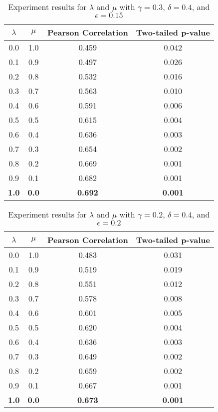 \documentclass{article}
\begin{document}
\begin{table}[h!]
\centering
\begin{tabular}{|c|c||c|c|}
	\hline
	$\lambda$ & $\mu$ & Pearson Correlation & Two-tailed p-value \\
	\hline
	0.0 & 1.0 & 0.459 & 0.042 \\
	0.1 & 0.9 & 0.497 & 0.026 \\
	0.2 & 0.8 & 0.532 & 0.016 \\
	0.3 & 0.7 & 0.563 & 0.010 \\
	0.4 & 0.6 & 0.591 & 0.006 \\
	0.5 & 0.5 & 0.615 & 0.004 \\
	0.6 & 0.4 & 0.636 & 0.003 \\
	0.7 & 0.3 & 0.654 & 0.002 \\
	0.8 & 0.2 & 0.669 & 0.001 \\
	0.9 & 0.1 & 0.682 & 0.001 \\
	\textbf{1.0} & \textbf{0.0} & \textbf{0.692} & \textbf{0.001} \\
	\hline
\end{tabular}
\caption{Experiment results for $\lambda$ and $\mu$ with $\gamma = 0.3$, $\delta = 0.4$, and $\epsilon = 0.15$}
\label{table:lambdamuresults1}
\end{table}

\begin{table}[h!]
\centering
\begin{tabular}{|c|c||c|c|}
	\hline
	$\lambda$ & $\mu$ & Pearson Correlation & Two-tailed p-value \\
	\hline
	0.0 & 1.0 & 0.483 & 0.031 \\
	0.1 & 0.9 & 0.519 & 0.019 \\
	0.2 & 0.8 & 0.551 & 0.012 \\
	0.3 & 0.7 & 0.578 & 0.008 \\
	0.4 & 0.6 & 0.601 & 0.005 \\
	0.5 & 0.5 & 0.620 & 0.004 \\
	0.6 & 0.4 & 0.636 & 0.003 \\
	0.7 & 0.3 & 0.649 & 0.002 \\
	0.8 & 0.2 & 0.659 & 0.002 \\
	0.9 & 0.1 & 0.667 & 0.001 \\
	\textbf{1.0} & \textbf{0.0} & \textbf{0.673} & \textbf{0.001} \\	
	\hline
\end{tabular}
\caption{Experiment results for $\lambda$ and $\mu$ with $\gamma = 0.2$, $\delta = 0.4$, and $\epsilon = 0.2$}
\label{table:lambdamuresults2}
\end{table}
\end{document}
